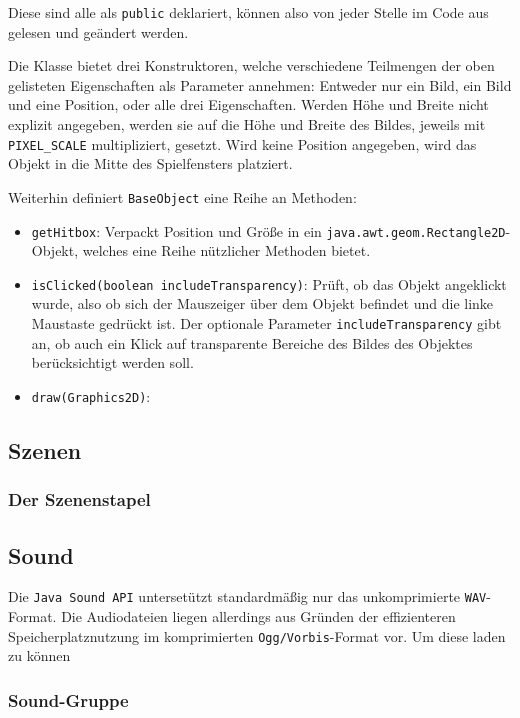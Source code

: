 \begin{sloppypar}
Diese sind alle als \texttt{public} deklariert, können also
von jeder Stelle im Code aus gelesen und geändert werden.

Die Klasse bietet drei Konstruktoren, welche verschiedene
Teilmengen der oben gelisteten Eigenschaften als Parameter
annehmen: Entweder nur ein Bild, ein Bild und eine Position,
oder alle drei Eigenschaften. Werden Höhe und Breite nicht
explizit angegeben, werden sie auf die Höhe und Breite des
Bildes, jeweils mit \texttt{PIXEL\_SCALE} multipliziert,
gesetzt. Wird keine Position angegeben, wird das Objekt
in die Mitte des Spielfensters platziert.

Weiterhin definiert \texttt{BaseObject} eine Reihe an
Methoden:

\begin{itemize}
	\item \texttt{getHitbox}: Verpackt Position und Größe in ein
	      \texttt{java.awt.geom.Rectangle2D}-Objekt, welches eine
	      Reihe nützlicher Methoden bietet.
	\item \texttt{isClicked(boolean includeTransparency)}: Prüft,
	      ob das Objekt angeklickt wurde, also ob sich der Mauszeiger
	      über dem Objekt befindet und die linke Maustaste gedrückt
	      ist. Der optionale Parameter \texttt{includeTransparency}
	      gibt an, ob auch ein Klick auf transparente Bereiche
	      des Bildes des Objektes berücksichtigt werden soll.
	\item \texttt{draw(Graphics2D)}: 
\end{itemize}


\subsection{Szenen}

\subsubsection{Der Szenenstapel} \label{programm:engine:szene:stapel}


\subsection{Sound}

Die \texttt{Java Sound API} untersetützt standardmäßig nur das unkomprimierte \texttt{WAV}-Format. Die Audiodateien liegen allerdings 
aus Gründen der effizienteren Speicherplatznutzung im komprimierten \texttt{Ogg/Vorbis}-Format vor. Um diese laden zu können

\subsubsection{Sound-Gruppe} \label{programm:engine:sound:gruppe}

\end{sloppypar}